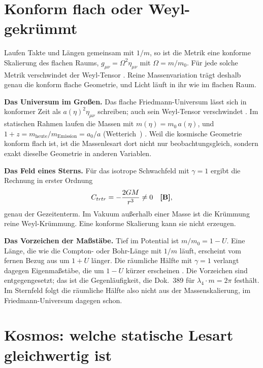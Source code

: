 \section{Konform flach oder Weyl-gekrümmt}

Laufen Takte und Längen gemeinsam mit $1/m$, so ist die Metrik eine konforme Skalierung des flachen
Raums, $g_{\mu\nu}=\Omega^2\eta_{\mu\nu}$ mit $\Omega=m/m_0$. Für jede solche Metrik verschwindet der
Weyl-Tensor \BM. Reine Massenvariation trägt deshalb genau die konform flache Geometrie, und Licht
läuft in ihr wie im flachen Raum.

\textbf{Das Universum im Großen.} Das flache Friedmann-Universum lässt sich in konformer Zeit als
$a(\eta)^2\eta_{\mu\nu}$ schreiben; auch sein Weyl-Tensor verschwindet \BM. Im statischen Rahmen
laufen die Massen mit $m(\eta)=m_0\,a(\eta)$, und $1+z=m_{\text{heute}}/m_{\text{Emission}}=a_0/a$
(Wetterich~\cite{Wetterich2013}) \QM. Weil die kosmische Geometrie konform flach ist, ist die
Massenlesart dort nicht nur beobachtungsgleich, sondern exakt dieselbe Geometrie in anderen Variablen.

\textbf{Das Feld eines Sterns.} Für das isotrope Schwachfeld mit $\gamma=1$ ergibt die Rechnung in
erster Ordnung
\begin{equation}
C_{trtr}=-\frac{2GM}{r^3}\neq0\quad\textbf{[B]},
\end{equation}
genau der Gezeitenterm. Im Vakuum außerhalb einer Masse ist die Krümmung reine Weyl-Krümmung. Eine
konforme Skalierung kann sie nicht erzeugen.

\textbf{Das Vorzeichen der Maßstäbe.} Tief im Potential ist $m/m_0=1-U$. Eine Länge, die wie die
Compton- oder Bohr-Länge mit $1/m$ läuft, erscheint vom fernen Bezug aus um $1+U$ länger. Die
räumliche Hälfte mit $\gamma=1$ verlangt dagegen Eigenmaßstäbe, die um $1-U$ kürzer erscheinen
\BM. Die Vorzeichen sind entgegengesetzt; das ist die Gegenläufigkeit, die Dok.~389 für
$\lambda_4\cdot m=2\pi$ festhält. Im Sternfeld folgt die räumliche Hälfte also nicht aus der
Massenskalierung, im Friedmann-Universum dagegen schon.

\section{Kosmos: welche statische Lesart gleichwertig ist}

